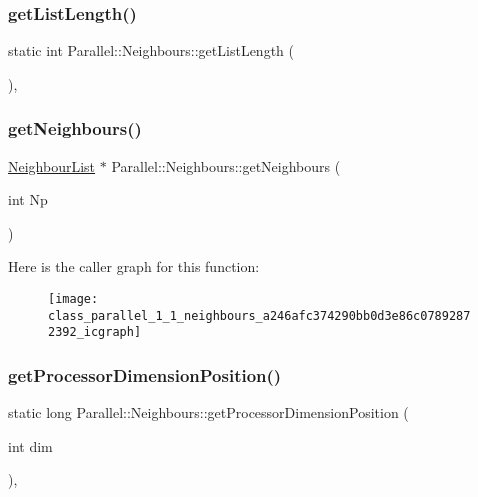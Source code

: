 \subsubsection{\texorpdfstring{getListLength()}{getListLength()}}
{\footnotesize\ttfamily static int Parallel\+::\+Neighbours\+::get\+List\+Length (\begin{DoxyParamCaption}{ }\end{DoxyParamCaption})\hspace{0.3cm}{\ttfamily [inline]}, {\ttfamily [static]}}

\mbox{\label{class_parallel_1_1_neighbours_a246afc374290bb0d3e86c07892872392}} 
\subsubsection{\texorpdfstring{getNeighbours()}{getNeighbours()}}
{\footnotesize\ttfamily \mbox{\hyperlink{struct_neighbour_list}{Neighbour\+List}} $\ast$ Parallel\+::\+Neighbours\+::get\+Neighbours (\begin{DoxyParamCaption}\item[{int}]{Np }\end{DoxyParamCaption})\hspace{0.3cm}{\ttfamily [static]}}

Here is the caller graph for this function\+:\nopagebreak
\begin{figure}[H]
\begin{center}
\leavevmode
\texttt{[image: class\_parallel\_1\_1\_neighbours\_a246afc374290bb0d3e86c07892872392\_icgraph]}
\end{center}
\end{figure}
\mbox{\label{class_parallel_1_1_neighbours_ad1a2a616b4089eded3545faf11409b85}} 
\subsubsection{\texorpdfstring{getProcessorDimensionPosition()}{getProcessorDimensionPosition()}}
{\footnotesize\ttfamily static long Parallel\+::\+Neighbours\+::get\+Processor\+Dimension\+Position (\begin{DoxyParamCaption}\item[{int}]{dim }\end{DoxyParamCaption})\hspace{0.3cm}{\ttfamily [inline]}, {\ttfamily [static]}}

